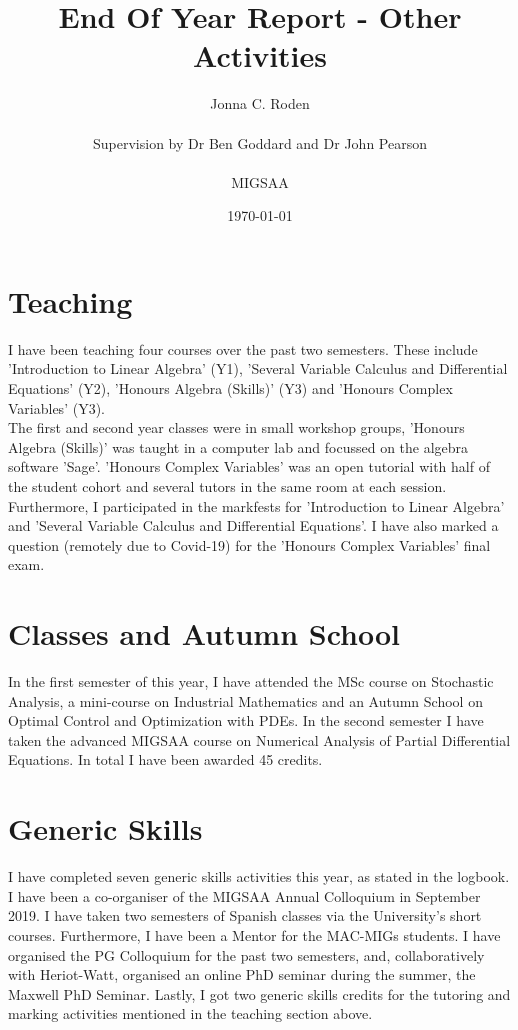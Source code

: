 \documentclass[11pt, a4paper]{article}
\title{End Of Year Report - Other Activities}
\author{Jonna C. Roden\\ \\Supervision by Dr Ben Goddard and Dr John Pearson\\ \\ \vspace{0.5cm} MIGSAA}
\date{\today}
\theoremstyle{definition}
\begin{document}
\maketitle

	
\section{Teaching}
I have been teaching four courses over the past two semesters. These include 'Introduction to Linear Algebra' (Y1), 'Several Variable Calculus and Differential Equations' (Y2), 'Honours Algebra (Skills)' (Y3) and 'Honours Complex Variables' (Y3).\\
The first and second year classes were in small workshop groups, 'Honours Algebra (Skills)' was taught in a computer lab and focussed on the algebra software 'Sage'. 'Honours Complex Variables' was an open tutorial with half of the student cohort and several tutors in the same room at each session.\\
Furthermore, I participated in the markfests for 'Introduction to Linear Algebra' and 'Several Variable Calculus and Differential Equations'. I have also marked a question (remotely due to Covid-19) for the 'Honours Complex Variables' final exam.
\section{Classes and Autumn School}
In the first semester of this year, I have attended the MSc course on Stochastic Analysis, a mini-course on Industrial Mathematics and an Autumn School on Optimal Control and Optimization with PDEs. In the second semester I have taken the advanced MIGSAA course on Numerical Analysis of Partial Differential Equations. In total I have been awarded 45 credits.
\section{Generic Skills}
I have completed seven generic skills activities this year, as stated in the logbook. I have been a co-organiser of the MIGSAA Annual Colloquium in September 2019. I have taken two semesters of Spanish classes via the University's short courses. Furthermore, I have been a Mentor for the MAC-MIGs students. I have organised the PG Colloquium for the past two semesters, and, collaboratively with Heriot-Watt, organised an online PhD seminar during the summer, the Maxwell PhD Seminar.
Lastly, I got two generic skills credits for the tutoring and marking activities mentioned in the teaching section above.
\end{document}
